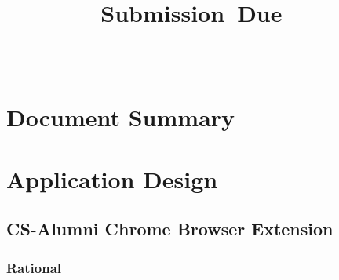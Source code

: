 \documentclass{article}
\title{
\vspace{2in}
\textmd{\textbf{\hmwkShortCode\\ \hmwkClass}}\\
\normalsize
\vspace{0.1in}
\textbf{\hmwkTitle}\\
\vspace{0.1in}
\small{Submission\ Due\ \hmwkClassTime\ \hmwkDueDate}\\
\vspace{3in}
}
\author{
\textbf{\hmwkAuthorName}\\
\hmwkStudentId
}
\date{} %
\begin{document}
\maketitle



\newpage
\tableofcontents
\newpage


\section{Document Summary}

\section{Application Design}

\subsection{CS-Alumni Chrome Browser Extension}

\subsubsection{Rational}
\end{document}
